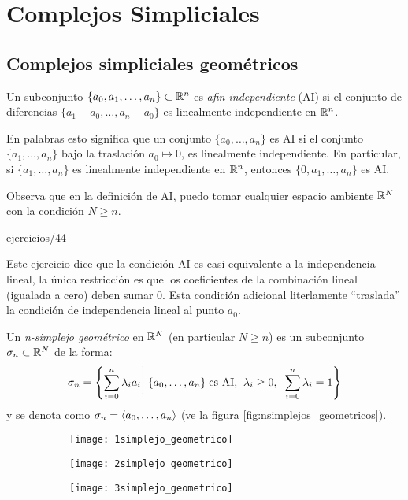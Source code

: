 \documentclass[../../topologia_algebraica]{subfiles}
\begin{document}
\section{Complejos Simpliciales}

\subsection{Complejos simpliciales geom\'etricos}

\begin{defin}
  Un subconjunto $\{a_0,a_1,\ldots,a_n\}\subset\mathbb{R}^n$ es \emph{afin-independiente} (AI) si
  el conjunto de diferencias $\{a_1-a_0,\ldots,a_n-a_0\}$ es linealmente independiente en $\mathbb{R}^n$. 
\end{defin}

En palabras esto significa que un conjunto $\{a_0,\ldots,a_n\}$ es AI si el conjunto $\{a_1,\ldots,a_n\}$
bajo la traslaci\'on $a_0\mapsto 0$, es linealmente independiente. En particular, si
$\{a_1,\ldots,a_n\}$ es linealmente independiente en $\mathbb{R}^n$, entonces $\{0,a_1,\ldots,a_n\}$ es AI.

Observa que en la definici\'on de AI, puedo tomar cualquier espacio ambiente $\mathbb{R}^N$ con la
condici\'on $N\geq n$.

{ejercicios/44} %

Este ejercicio dice que la condici\'on AI es casi equivalente a la independencia lineal, la \'unica
restricci\'on es que los coeficientes de la combinaci\'on lineal (igualada a cero) deben sumar 0.
Esta condici\'on adicional literlamente ``traslada'' la condici\'on de independencia lineal al punto
$a_0$.

\begin{defin}
  Un \emph{n-simplejo geom\'etrico} en $\mathbb{R}^N$ (en particular $N\geq n$) es un subconjunto
  $\sigma_n\subset\mathbb{R}^N$ de la forma:
  \[
    \sigma_n=
    \left\{\sum_{i=0}^n\la_ia_i \right|%
    \left. \{a_0,\ldots,a_n\}\;\text{es AI,}\;\;\la_i\geq 0,\;\; \sum_{i=0}^n\la_i=1\right\}
  \]
  y se denota como $\sigma_n=\langle a_0,\ldots,a_n \rangle$ (ve la figura \ref{fig:nsimplejos_geometricos}).
\end{defin}

\begin{figure}[ht] %
  \centering
  \caption{Ejemplos de $n$-simplejos geom\'etricos de dimensi\'on 1,2 y 3}
  \label{fig:nsimplejos_geometricos}
  \begin{subfigure}{0.3\textwidth}
    \texttt{[image: 1simplejo\_geometrico]}    
  \end{subfigure}
  \begin{subfigure}{0.3\textwidth}
    \texttt{[image: 2simplejo\_geometrico]}    
  \end{subfigure}
  \begin{subfigure}{0.3\textwidth}
    \texttt{[image: 3simplejo\_geometrico]}    
  \end{subfigure}
\end{figure}%
\end{document}
